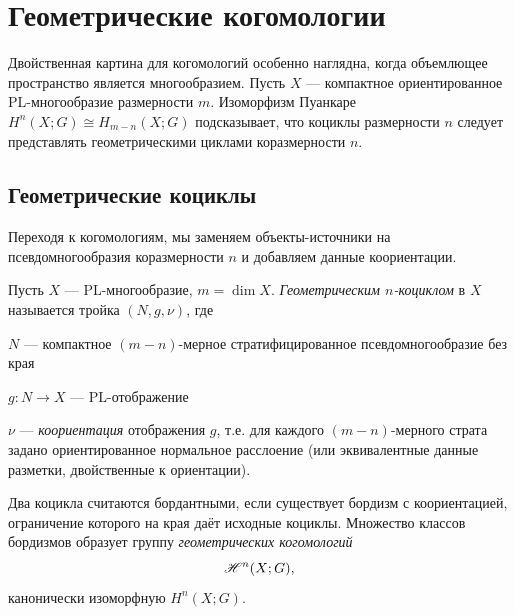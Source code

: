 \documentclass[12pt]{article}
\begin{document}
\section{Геометрические когомологии}

Двойственная картина для когомологий особенно наглядна, когда объемлющее пространство является многообразием. Пусть $X$ --- компактное ориентированное PL-многообразие размерности $m$. Изоморфизм Пуанкаре $H^n(X;G) \cong H_{m-n}(X;G)$ подсказывает, что коциклы размерности $n$ следует представлять геометрическими циклами коразмерности $n$.

\subsection{Геометрические коциклы}

Переходя к когомологиям, мы заменяем объекты-источники на псевдомногообразия коразмерности $n$ и добавляем данные коориентации.

\begin{definition}\label{def:geomcocycle}
Пусть $X$ --- PL-многообразие, $m = \dim X$. \emph{Геометрическим $n$-коциклом} в $X$ называется тройка $(N, g, \nu)$, где
\begin{inumerate}
\item $N$ --- компактное $(m-n)$-мерное стратифицированное псевдомногообразие без края
\item $g : N \to X$ --- PL-отображение
\item $\nu$ --- \emph{коориентация} отображения $g$, т.е. для каждого $(m-n)$-мерного страта задано ориентированное нормальное расслоение (или эквивалентные данные разметки, двойственные к ориентации).
\end{inumerate}
Два коцикла считаются бордантными, если существует бордизм с коориентацией, ограничение которого на края даёт исходные коциклы. Множество классов бордизмов образует группу \emph{геометрических когомологий}
\begin{equation}\label{eq:geomcocycle}
\mathscr{H}^n(X;G),
\end{equation}
канонически изоморфную $H^n(X;G)$.
\end{definition}
\end{document}
